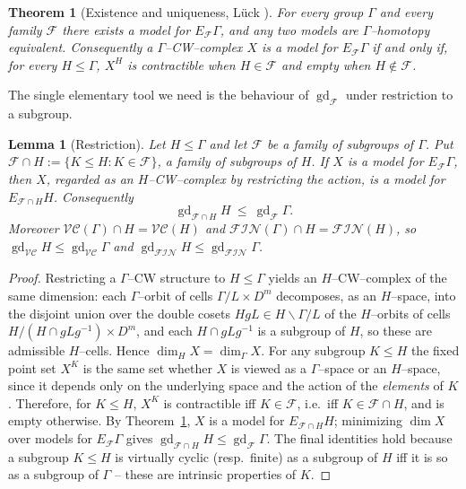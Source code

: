 \documentclass{amsart}
\newtheorem{theorem}{Theorem}
\newtheorem{lemma}{Lemma}
\theoremstyle{definition}
\newcommand{\FIN}{\mathcal{F\!I\!N}}
\newcommand{\VC}{\mathcal{V\!C}}
\newcommand{\gd}{\operatorname{gd}}
\begin{document}
\begin{theorem}[Existence and uniqueness, {Lück \cite[\S1--2]{LueckSurvey}}]\label{thm:exist}
For every group $\Gamma$ and every family $\mathcal F$ there exists a model for
$E_{\mathcal F}\Gamma$, and any two models are $\Gamma$--homotopy equivalent. Consequently a
$\Gamma$--CW--complex $X$ is a model for $E_{\mathcal F}\Gamma$ if and only if, for every
$H\le\Gamma$, $X^{H}$ is contractible when $H\in\mathcal F$ and empty when
$H\notin\mathcal F$.
\end{theorem}

The single elementary tool we need is the behaviour of $\gd_{\mathcal F}$ under restriction to a
subgroup.

\begin{lemma}[Restriction]\label{lem:restrict}
Let $H\le\Gamma$ and let $\mathcal F$ be a family of subgroups of $\Gamma$. Put
$\mathcal F\cap H:=\{K\le H : K\in\mathcal F\}$, a family of subgroups of $H$. If $X$ is a model
for $E_{\mathcal F}\Gamma$, then $X$, regarded as an $H$--CW--complex by restricting the action,
is a model for $E_{\mathcal F\cap H}H$. Consequently
\[
\gd_{\mathcal F\cap H} H\ \le\ \gd_{\mathcal F}\Gamma .
\]
Moreover $\VC(\Gamma)\cap H=\VC(H)$ and $\FIN(\Gamma)\cap H=\FIN(H)$, so
$\gd_{\VC}H\le\gd_{\VC}\Gamma$ and $\gd_{\FIN}H\le\gd_{\FIN}\Gamma$.
\end{lemma}

\begin{proof}
Restricting a $\Gamma$--CW structure to $H\le\Gamma$ yields an $H$--CW--complex of the same
dimension: each $\Gamma$--orbit of cells $\Gamma/L\times D^{m}$ decomposes, as an
$H$--space, into the disjoint union over the double cosets $HgL\in H\backslash \Gamma/L$ of the
$H$--orbits of cells $H/(H\cap gLg^{-1})\times D^{m}$, and each $H\cap gLg^{-1}$ is a subgroup
of $H$, so these are admissible $H$--cells. Hence $\dim_H X=\dim_\Gamma X$. For any subgroup
$K\le H$ the fixed point set $X^{K}$ is the same set whether $X$ is viewed as a $\Gamma$--space
or an $H$--space, since it depends only on the underlying space and the action of the
\emph{elements} of $K$. Therefore, for $K\le H$, $X^{K}$ is contractible iff $K\in\mathcal F$,
i.e.\ iff $K\in\mathcal F\cap H$, and is empty otherwise. By Theorem~\ref{thm:exist}, $X$ is a
model for $E_{\mathcal F\cap H}H$; minimizing $\dim X$ over models for $E_{\mathcal F}\Gamma$
gives $\gd_{\mathcal F\cap H}H\le\gd_{\mathcal F}\Gamma$. The final identities hold because a
subgroup $K\le H$ is virtually cyclic (resp.\ finite) as a subgroup of $H$ iff it is so as a
subgroup of $\Gamma$ -- these are intrinsic properties of $K$.
\end{proof}
\end{document}

